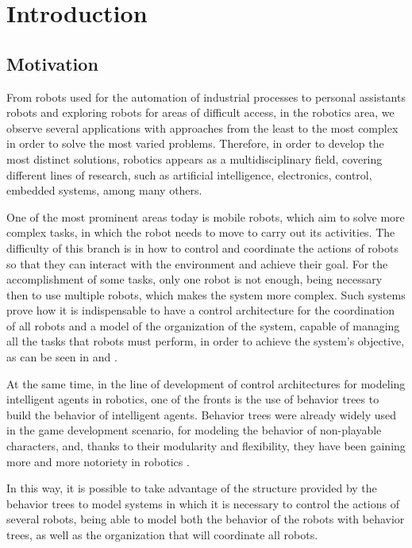 \chapter{Introduction}

\section{Motivation}

From robots used for the automation of industrial processes to personal assistants robots and exploring robots for areas of difficult access, in the robotics area, we observe several applications with approaches from the least to the most complex in order to solve the most varied problems. Therefore, in order to develop the most distinct solutions, robotics appears as a multidisciplinary field, covering different lines of research, such as artificial intelligence, electronics, control, embedded systems, among many others.

One of the most prominent areas today is mobile robots, which aim to solve more complex tasks, in which the robot needs to move to carry out its activities. The difficulty of this branch is in how to control and coordinate the actions of robots so that they can interact with the environment and achieve their goal. For the accomplishment of some tasks, only one robot is not enough, being necessary then to use multiple robots, which makes the system more complex. Such systems prove how it is indispensable to have a control architecture for the coordination of all robots and a model of the organization of the system, capable of managing all the tasks that robots must perform, in order to achieve the system's objective, as can be seen in \cite{ACMultiplosRobos} and \cite{Moise}.

At the same time, in the line of development of control architectures for modeling intelligent agents in robotics, one of the fronts is the use of behavior trees to build the behavior of intelligent agents. Behavior trees were already widely used in the game development scenario, for modeling the behavior of non-playable characters, and, thanks to their modularity and flexibility, they have been gaining more and more notoriety in robotics \cite{BTsInRobotics}.

In this way, it is possible to take advantage of the structure provided by the behavior trees to model systems in which it is necessary to control the actions of several robots, being able to model both the behavior of the robots with behavior trees, as well as the organization that will coordinate all robots.

